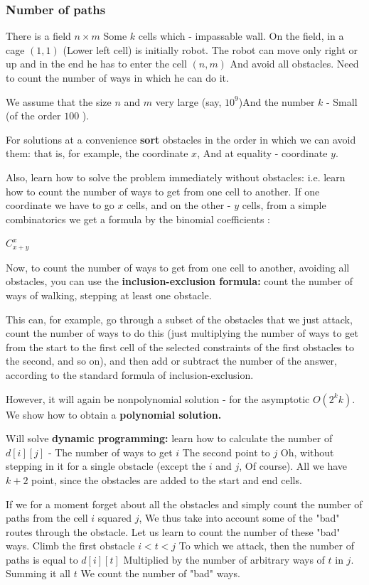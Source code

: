 \subsubsection{ Number of paths }

There is a field $n \times m$ Some $k$ cells which - impassable wall. On the field, in a cage $(1,1)$ (Lower left cell) is initially robot. The robot can move only right or up and in the end he has to enter the cell $(n, m)$ And avoid all obstacles. Need to count the number of ways in which he can do it.

We assume that the size $n$ and $m$ very large (say, $10 ^ 9$)And the number $k$ - Small (of the order $100$ ).

For solutions at a convenience \textbf{sort} obstacles in the order in which we can avoid them: that is, for example, the coordinate $x$, And at equality - coordinate $y$.

Also, learn how to solve the problem immediately without obstacles: i.e. learn how to count the number of ways to get from one cell to another. If one coordinate we have to go $x$ cells, and on the other - $y$ cells, from a simple combinatorics we get a formula by the binomial coefficients :

$C_ {x + y} ^ {x}$

Now, to count the number of ways to get from one cell to another, avoiding all obstacles, you can use the \textbf{inclusion-exclusion formula:} count the number of ways of walking, stepping at least one obstacle.

This can, for example, go through a subset of the obstacles that we just attack, count the number of ways to do this (just multiplying the number of ways to get from the start to the first cell of the selected constraints of the first obstacles to the second, and so on), and then add or subtract the number of the answer, according to the standard formula of inclusion-exclusion.

However, it will again be nonpolynomial solution - for the asymptotic $O (2 ^ k k)$. We show how to obtain a \textbf{polynomial solution.}

Will solve \textbf{dynamic programming:} learn how to calculate the number of $d [i][j]$ - The number of ways to get $i$ The second point to $j$ Oh, without stepping in it for a single obstacle (except the $i$ and $j$, Of course). All we have $k +2$ point, since the obstacles are added to the start and end cells.

If we for a moment forget about all the obstacles and simply count the number of paths from the cell $i$ squared $j$, We thus take into account some of the "bad" routes through the obstacle. Let us learn to count the number of these "bad" ways. Climb the first obstacle $i <t <j$ To which we attack, then the number of paths is equal to $d [i][t]$ Multiplied by the number of arbitrary ways of $t$ in $j$. Summing it all $t$ We count the number of "bad" ways.

